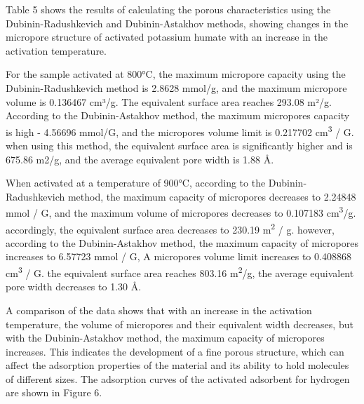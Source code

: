 
Table 5 shows the results of calculating the porous characteristics
using the Dubinin-Radushkevich and Dubinin-Astakhov methods, showing
changes in the micropore structure of activated potassium humate with an
increase in the activation temperature.

For the sample activated at 800°C, the maximum micropore capacity using
the Dubinin-Radushkevich method is 2.8628 mmol/g, and the maximum
micropore volume is 0.136467 cm³/g. The equivalent surface area reaches
293.08 m²/g. According to the Dubinin-Astakhov method, the maximum
micropores capacity is high - 4.56696 mmol/G, and the micropores volume
limit is 0.217702 cm\textsuperscript{3} / G. when using this method, the
equivalent surface area is significantly higher and is 675.86 m2/g, and
the average equivalent pore width is 1.88 Å.

When activated at a temperature of 900°C, according to the
Dubinin-Radushkevich method, the maximum capacity of micropores
decreases to 2.24848 mmol / G, and the maximum volume of micropores
decreases to 0.107183 cm\textsuperscript{3}/g. accordingly, the
equivalent surface area decreases to 230.19 m\textsuperscript{2} / g.
however, according to the Dubinin-Astakhov method, the maximum capacity
of micropores increases to 6.57723 mmol / G, A micropores volume limit
increases to 0.408868 cm\textsuperscript{3} / G. the equivalent surface
area reaches 803.16 m\textsuperscript{2}/g, the average equivalent pore
width decreases to 1.30 Å.

A comparison of the data shows that with an increase in the activation
temperature, the volume of micropores and their equivalent width
decreases, but with the Dubinin-Astakhov method, the maximum capacity of
micropores increases. This indicates the development of a fine porous
structure, which can affect the adsorption properties of the material
and its ability to hold molecules of different sizes. The adsorption
curves of the activated adsorbent for hydrogen are shown in Figure 6.

